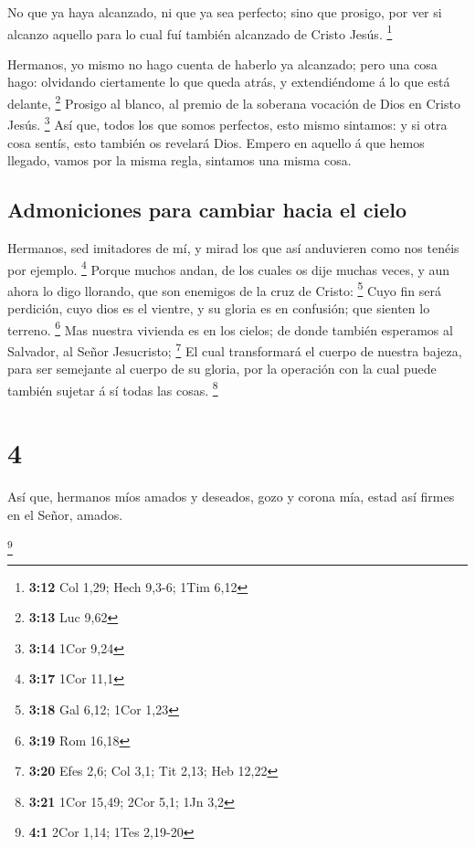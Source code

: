  No que ya haya alcanzado, ni que ya sea perfecto; sino que
prosigo, por ver si alcanzo aquello para lo cual fuí también alcanzado
de Cristo Jesús. \footnote{\textbf{3:12} Col 1,29; Hech 9,3-6; 1Tim 6,12}

 Hermanos, yo mismo no hago cuenta de haberlo ya alcanzado;
pero una cosa hago: olvidando ciertamente lo que queda atrás, y
extendiéndome á lo que está delante, \footnote{\textbf{3:13} Luc 9,62}
 Prosigo al blanco, al premio de la soberana vocación de
Dios en Cristo Jesús. \footnote{\textbf{3:14} 1Cor 9,24} 
Así que, todos los que somos perfectos, esto mismo sintamos: y si otra
cosa sentís, esto también os revelará Dios.  Empero en
aquello á que hemos llegado, vamos por la misma regla, sintamos una
misma cosa.

\hypertarget{admoniciones-para-cambiar-hacia-el-cielo}{%
\subsection{Admoniciones para cambiar hacia el
cielo}\label{admoniciones-para-cambiar-hacia-el-cielo}}

 Hermanos, sed imitadores de mí, y mirad los que así
anduvieren como nos tenéis por ejemplo. \footnote{\textbf{3:17} 1Cor
  11,1}  Porque muchos andan, de los cuales os dije muchas
veces, y aun ahora lo digo llorando, que son enemigos de la cruz de
Cristo: \footnote{\textbf{3:18} Gal 6,12; 1Cor 1,23}  Cuyo
fin será perdición, cuyo dios es el vientre, y su gloria es en
confusión; que sienten lo terreno. \footnote{\textbf{3:19} Rom 16,18}
 Mas nuestra vivienda es en los cielos; de donde también
esperamos al Salvador, al Señor Jesucristo; \footnote{\textbf{3:20} Efes
  2,6; Col 3,1; Tit 2,13; Heb 12,22}  El cual transformará
el cuerpo de nuestra bajeza, para ser semejante al cuerpo de su gloria,
por la operación con la cual puede también sujetar á sí todas las cosas.
\footnote{\textbf{3:21} 1Cor 15,49; 2Cor 5,1; 1Jn 3,2}

\hypertarget{section-3}{%
\section{4}\label{section-3}}

 Así que, hermanos míos amados y deseados, gozo y corona
mía, estad así firmes en el Señor, amados.

\footnote{\textbf{4:1} 2Cor 1,14; 1Tes 2,19-20}

